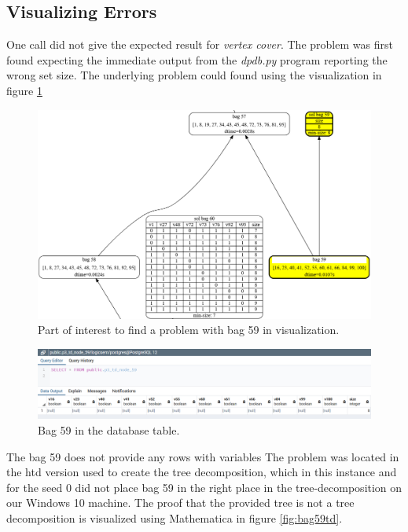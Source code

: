 \documentclass[a4paper, 12pt, bibliography=totoc]{scrartcl}
\begin{document}
\subsection{Visualizing Errors}
 
 One call did not give the expected result for \textit{vertex cover}. The problem was first found expecting the immediate output from the \textit{dpdb.py} program reporting the wrong set size. The underlying problem could found using the visualization in figure \ref{fig:starsbag59}

\begin{figure}[H]
	\centering
	\vspace{1em}
	\includegraphics[width=0.9\linewidth,height=0.9\textheight,keepaspectratio]{images/starsbag59.png}
		\vspace{1em}
	\caption{Part of interest to find a problem with bag 59 in visualization. }
	\label{fig:starsbag59}
\end{figure}

\begin{figure}[H]
	\centering
	\includegraphics[width=0.9\linewidth,height=0.9\textheight,keepaspectratio]{images/Found bag 59 in stars100 with seed0.png}
	\caption{Bag 59 in the database table.}
	\label{fig:bag59visu}
\end{figure}

The bag 59 does not provide any rows with variables 
The problem was located in the htd version used to create the tree decomposition, which in this instance and for the seed $0$ did not place bag 59 in the right place in the tree-decomposition on our Windows 10 machine. The proof that the provided tree is not a tree decomposition is visualized using Mathematica \cite{Mathematica} in figure \ref{fig:bag59td}.
\end{document}
